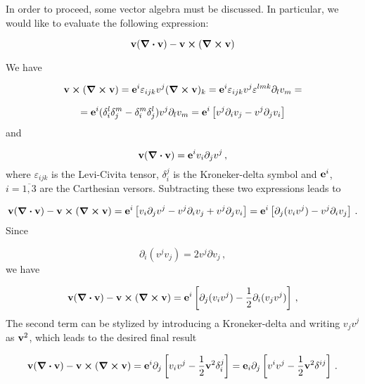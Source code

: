 \documentclass[12pt, class=report, crop=false]{standalone}
\begin{document}
In order to proceed, some vector algebra must be discussed. In particular, we would like to evaluate the following expression:

\begin{equation*}
  \vb{v}(\div{\vb{v}}) - \vb{v}\cp(\curl{\vb{v}})
\end{equation*}

We have

\begin{equation*}
  \vb{v}\cp(\curl{\vb{v}}) = \vb{e}^{i} \varepsilon_{ijk} v^{j} (\curl{\vb{v}})_{k} = \vb{e}^{i} \varepsilon_{ijk} v^{j} \varepsilon^{lmk} \partial_{l} v_{m} =
\end{equation*}

\begin{equation*}
  = \vb{e}^{i} (\delta_{i}^{l}\delta_{j}^{m}-\delta_{i}^{m}\delta_{j}^{l}) v^{j} \partial_{l} v_{m} =
  \vb{e}^{i} \left[ v^{j} \partial_{i} v_{j} - v^{j} \partial_{j} v_{i} \right]
\end{equation*}
and

\begin{equation*}
  \vb{v}(\div{\vb{v}}) = \vb{e}^{i} v_{i} \partial_{j} v^{j} \,,
\end{equation*}
where \(\varepsilon_{ijk}\) is the Levi-Civita tensor, \(\delta_{i}^{j}\) is the Kroneker-delta symbol and \(\vb{e}^{i}\), \(i=\overline{1,3}\) are the Carthesian versors. Subtracting these two expressions leads to

\begin{equation*}
  \vb{v}(\div{\vb{v}}) - \vb{v}\cp(\curl{\vb{v}}) = \vb{e}^{i} \left[ v_{i} \partial_{j} v^{j} - v^{j} \partial_{i} v_{j} + v^{j} \partial_{j} v_{i} \right] = \vb{e}^{i} \left[ \partial_{j} (v_{i} v^{j}) - v^{j} \partial_{i} v_{j} \right] \,.
\end{equation*}
Since

\begin{equation*}
  \partial_{i} (v^{j} v_{j}) = 2 v^{j} \partial v_{j} \,,
\end{equation*}
we have

\begin{equation*}
  \vb{v}(\div{\vb{v}}) - \vb{v}\cp(\curl{\vb{v}}) = \vb{e}^{i} \left[ \partial_{j} (v_{i} v^{j}) - \frac{1}{2} \partial_{i} (v_{j}v^{j}) \right] \,,
\end{equation*}
The second term can be stylized by introducing a Kroneker-delta and writing \(v_{j}v^{j}\) as \(\vb{v}^{2}\), which leads to the desired final result

\begin{equation}
  \label{expression-2}
  \vb{v}(\div{\vb{v}}) - \vb{v}\cp(\curl{\vb{v}}) = \vb{e}^{i} \partial_{j} \left[ v_{i} v^{j} - \frac{1}{2} \vb{v}^{2} \delta_{i}^{j} \right] = \vb{e}_{i} \partial_{j} \left[ v^{i} v^{j} - \frac{1}{2} \vb{v}^{2} \delta^{ij} \right]\,.
\end{equation}
\end{document}
